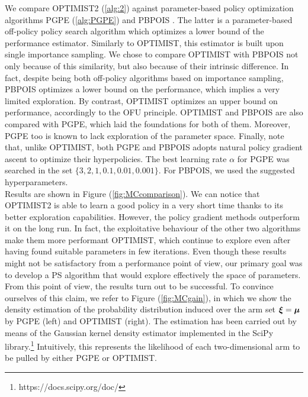 We compare \gls{OPTIMIST}2 (\ref{alg:2}) against parameter-based policy optimization algorithms \gls{PGPE} (\ref{alg:PGPE}) and \gls{PBPOIS} \cite{metelli2018policy}. The latter is a parameter-based off-policy policy search algorithm which optimizes a lower bound of the performance estimator. Similarly to \gls{OPTIMIST}, this estimator is built upon single importance sampling. We chose to compare \gls{OPTIMIST} with \gls{PBPOIS} not only because of this similarity, but also because of their intrinsic difference. In fact, despite being both off-policy algorithms based on importance sampling, \gls{PBPOIS} optimizes a lower bound on the performance, which implies a very limited exploration. By contrast, \gls{OPTIMIST} optimizes an upper bound on performance, accordingly to the \gls{OFU} principle. \gls{OPTIMIST} and \gls{PBPOIS} are also compared with \gls{PGPE}, which laid the foundations for both of them. Moreover, \gls{PGPE} too is known to lack exploration of the parameter space. Finally, note that, unlike \gls{OPTIMIST}, both \gls{PGPE} and \gls{PBPOIS} adopts natural policy gradient ascent to optimize their hyperpolicies.
The best learning rate $\alpha$ for \gls{PGPE} was searched in the set $\{3, 2, 1, 0.1, 0.01, 0.001\}$. For \gls{PBPOIS}, we used the suggested hyperparameters. \\

Results are shown in Figure (\ref{fig:MCcomparison}). We can notice that \gls{OPTIMIST}2 is able to learn a good policy in a very short time thanks to its better exploration capabilities. However, the policy gradient methods outperform it on the long run. In fact, the exploitative behaviour of the other two algorithms make them more performant \wrt \gls{OPTIMIST}, which continue to explore even after having found suitable parameters in few iterations. Even though these results might not be satisfactory from a performance point of view, our primary goal was to develop a \gls{PS} algorithm that would explore effectively the space of parameters. From this point of view, the results turn out to be successful. To convince ourselves of this claim, we refer to Figure (\ref{fig:MCgain}), in which we show the density estimation of the probability distribution induced over the arm set $\boldsymbol{\xi}=\boldsymbol{\mu}$ by \gls{PGPE} (left) and \gls{OPTIMIST} (right). The estimation has been carried out by means of the Gaussian kernel density estimator \cite{scott2015multivariate} implemented in the SciPy library.\footnote{https://docs.scipy.org/doc/} Intuitively, this represents the likelihood of each two-dimensional arm to be pulled by either \gls{PGPE} or \gls{OPTIMIST}. 

